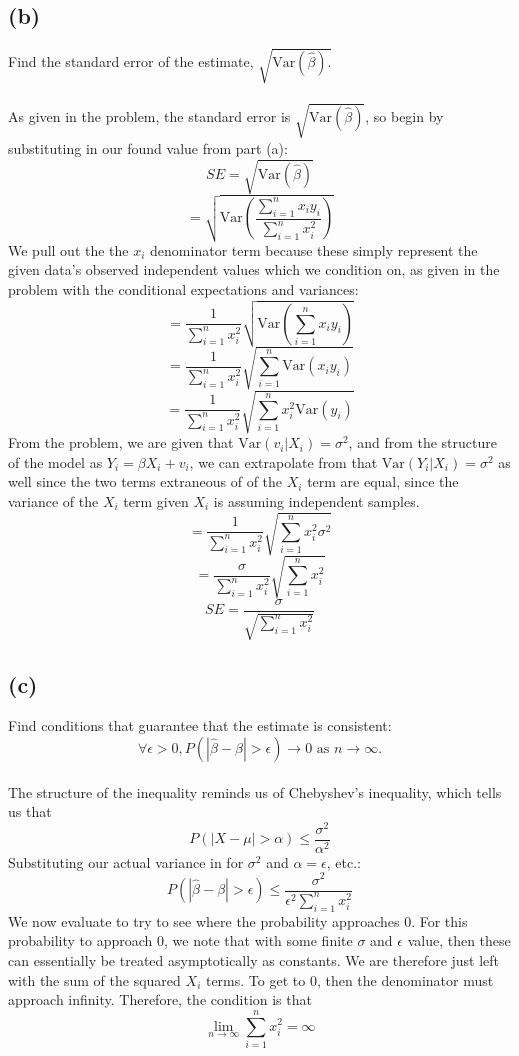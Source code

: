 \documentclass{article}
\begin{document}
{\subsection*{(b)}
Find the standard error of the estimate, \(\sqrt{\text{Var}(\hat{\beta}).}\) \\ \\
As given in the problem, the standard error is \(\sqrt{\text{Var}(\hat{\beta})}\), so begin by substituting in our found value from part (a):
\[
  SE = \sqrt{\text{Var}(\hat{\beta})}
\]
\[
  = \sqrt{\text{Var}(\frac{\sum_{i=1}^{n} x_i y_i}{\sum_{i=1}^{n} x_i^2})}
\]
We pull out the the \(x_i\) denominator term because these simply represent the given data's observed independent values which we condition on, as given in the problem with the conditional expectations and variances:
\[
  = \frac{1}{\sum_{i=1}^{n} x_i^2} \sqrt{\text{Var}(\sum_{i=1}^{n} x_i y_i)}
\]
\[
  = \frac{1}{\sum_{i=1}^{n} x_i^2} \sqrt{\sum_{i=1}^{n} \text{Var}(x_i y_i)}
\]
\[
  = \frac{1}{\sum_{i=1}^{n} x_i^2} \sqrt{\sum_{i=1}^{n} x_i^2 \text{Var}(y_i)}
\]
From the problem, we are given that \(\text{Var}(v_i | X_i) = \sigma^2\), and from the structure of the model as \(Y_i = \beta X_i + v_i\), we can extrapolate from that \(\text{Var}(Y_i | X_i) = \sigma^2\) as well since the two terms extraneous of of the \(X_i\) term are equal, since the variance of the \(X_i\) term given \(X_i\)  is  assuming independent samples. 
\[
  = \frac{1}{\sum_{i=1}^{n} x_i^2} \sqrt{\sum_{i=1}^{n} x_i^2 \sigma^2}
\]
\[
  = \frac{\sigma}{\sum_{i=1}^{n} x_i^2} \sqrt{\sum_{i=1}^{n} x_i^2}
\]
\[
  \boxed{SE = \frac{\sigma}{\sqrt{\sum_{i=1}^{n} x_i^2}}}
\]

\subsection*{(c)}
Find conditions that guarantee that the estimate is consistent: 
\[
  \forall \epsilon > 0, P(|\hat{\beta} - \beta| > \epsilon) \to 0 \text{ as } n \to \infty.
\] \\
The structure of the inequality reminds us of Chebyshev's inequality, which tells us that 
\[
  P(|X - \mu| > \alpha) \leq \frac{\sigma^2}{\alpha^2}
\]
Substituting our actual variance in for \(\sigma^2\) and \(\alpha = \epsilon\), etc.:
\[
  P(|\hat{\beta} - \beta| > \epsilon) \leq \frac{\sigma^2}{\epsilon^2 \sum_{i=1}^{n} x_i^2}
\]
We now evaluate to try to see where the probability approaches 0. For this probability to approach 0, we note that with some finite \(\sigma\) and \(\epsilon\) value, then these can essentially be treated asymptotically as constants. We are therefore just left with the sum of the squared \(X_i\) terms. To get to 0, then the denominator must approach infinity. Therefore, the condition is that 
\[
  \boxed{\lim_{n \to \infty} \sum_{i=1}^{n} x_i^2 = \infty}
\]

}
\end{document}
